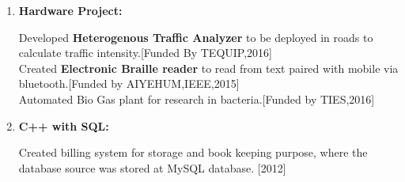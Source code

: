 \documentclass[11pt]{article}
\renewcommand{\section}[2]%
        {\pagebreak[2]\vspace{1.3\baselineskip}%
         \phantomsection\addcontentsline{toc}{section}{#1}%
         \hspace{0in}%
         \marginpar{
         \raggedright \scshape #1}#2}
\newenvironment{outerlist}[1][\enskip\textbullet]%
        {\begin{enumerate}[#1]}{\end{enumerate}%
         \vspace{-.6\baselineskip}}
\newcommand{\blankline}{\quad\pagebreak[2]}
\begin{document}
\begin{outerlist}
\item {\bf Hardware Project:}

Developed {\bf Heterogenous Traffic Analyzer} to be deployed in roads to calculate traffic intensity.[Funded By TEQUIP,2016]\\
Created {\bf Electronic Braille reader} to read from text paired with mobile via bluetooth.[Funded by AIYEHUM,IEEE,2015]\\
Automated Bio Gas plant for research in bacteria.[Funded by TIES,2016]

\item {\bf C++ with SQL:} 

Created billing system for storage and book keeping purpose, where the database source was stored at MySQL database. [2012]

\end{outerlist}


\renewcommand{\labelenumi}{\arabic{enumi}.}

%
%
%	
%	
%	
	
\end{document}
